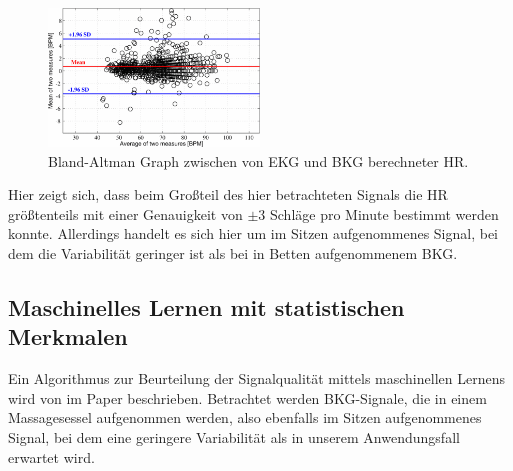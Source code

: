 	\begin{figure}[H]
		\centering
		\includegraphics[width=0.5\textwidth]{pic/bland-altman-pino.png}
		\caption[Genauigkeit der Herzratenberechnung bei schwellwertbasierter Artefakterkennung]{Bland-Altman Graph zwischen von \ac{EKG} und \ac{BKG} berechneter \ac{HR}.}
		\label{fig:bland-altman-pino}
	\end{figure}
	
	Hier zeigt sich, dass beim Großteil des hier betrachteten Signals die \ac{HR} größtenteils mit einer Genauigkeit von $\pm 3$ Schläge pro Minute bestimmt werden konnte. Allerdings handelt es sich hier um im Sitzen aufgenommenes Signal, bei dem die Variabilität geringer ist als bei in Betten aufgenommenem \ac{BKG}.
	
	
	\subsection{Maschinelles Lernen mit statistischen Merkmalen}\label{ml-beschreibung}	
	
	Ein Algorithmus zur Beurteilung der Signalqualität mittels maschinellen Lernens wird von \citeauthor{Sadek2016} im Paper  beschrieben. Betrachtet werden \ac{BKG}-Signale, die in einem Massagesessel aufgenommen werden, also ebenfalls im Sitzen aufgenommenes Signal, bei dem eine geringere Variabilität als in unserem Anwendungsfall erwartet wird.
	
